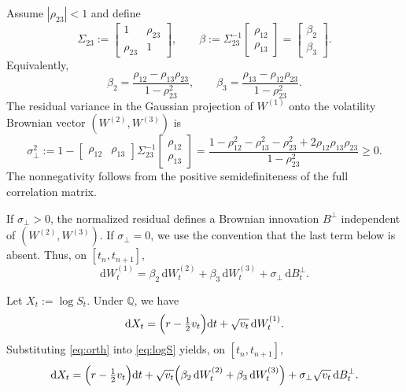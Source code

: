 \documentclass[10pt]{article}
\theoremstyle{plain}
\theoremstyle{definition}
\theoremstyle{remark}
\newcommand{\dd}{\mathrm d}
\newcommand{\Q}{\mathbb Q}
\begin{document}
Assume $|\rho_{23}|<1$ and define
\[
\Sigma_{23}:=
\begin{bmatrix}
1 & \rho_{23}\\
\rho_{23} & 1
\end{bmatrix},
\qquad
\beta:=\Sigma_{23}^{-1}
\begin{bmatrix}
\rho_{12}\\
\rho_{13}
\end{bmatrix}
=
\begin{bmatrix}
\beta_2\\
\beta_3
\end{bmatrix}.
\]
Equivalently,
\begin{equation}\label{eq:proj-coeffs}
\beta_2=\frac{\rho_{12}-\rho_{13}\rho_{23}}{1-\rho_{23}^2},
\qquad
\beta_3=\frac{\rho_{13}-\rho_{12}\rho_{23}}{1-\rho_{23}^2}.
\end{equation}
The residual variance in the Gaussian projection of $W^{(1)}$ onto the volatility Brownian vector
$(W^{(2)},W^{(3)})$ is
\begin{equation}\label{eq:sigperp}
\sigma_\perp^2
:=1-\begin{bmatrix}\rho_{12}&\rho_{13}\end{bmatrix}\Sigma_{23}^{-1}
\begin{bmatrix}\rho_{12}\\ \rho_{13}\end{bmatrix}
=\frac{1-\rho_{12}^2-\rho_{13}^2-\rho_{23}^2+2\rho_{12}\rho_{13}\rho_{23}}{1-\rho_{23}^2}\ge 0.
\end{equation}
The nonnegativity follows from the positive semidefiniteness of the full correlation matrix.

If $\sigma_\perp>0$, the normalized residual defines a Brownian innovation $B^\perp$ independent of
$(W^{(2)},W^{(3)})$. If $\sigma_\perp=0$, we use the convention that the last term below is absent. Thus,
on $[t_n,t_{n+1}]$,
\begin{equation}\label{eq:orth}
\dd W^{(1)}_t=\beta_2\,\dd W^{(2)}_t+\beta_3\,\dd W^{(3)}_t+\sigma_\perp\,\dd B^\perp_t.
\end{equation}

Let $X_t:=\log S_t$. Under $\Q$, we have
\begin{equation}\label{eq:logS}
\dd X_t=\Bigl(r-\tfrac12 v_t\Bigr)\dd t+\sqrt{v_t}\,\dd W^{(1)}_t.
\end{equation}
Substituting \eqref{eq:orth} into \eqref{eq:logS} yields, on $[t_n,t_{n+1}]$,
\[
\dd X_t=\Bigl(r-\tfrac12 v_t\Bigr)\dd t
+\sqrt{v_t}\Bigl(\beta_2\,\dd W^{(2)}_t+\beta_3\,\dd W^{(3)}_t\Bigr)
+\sigma_\perp\sqrt{v_t}\,\dd B^\perp_t.
\]
\end{document}
